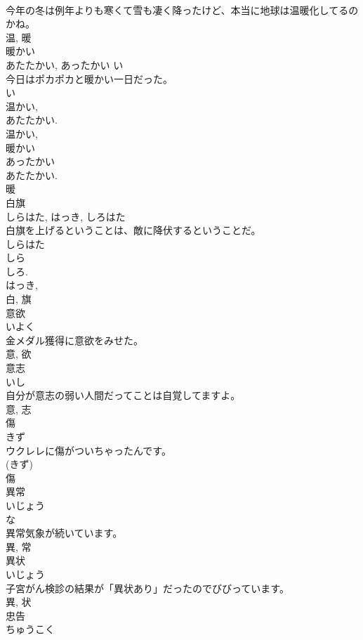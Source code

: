 \documentclass[8pt]{extreport}
\begin{document}
\begin{CJK}{UTF8}{min}
\\	今年の冬は例年よりも寒くて雪も凄く降ったけど、本当に地球は温暖化してるのかね。	
\\	温, 暖	
\\	暖かい	
\\	あたたかい, あったかい	い 
\\	今日はポカポカと暖かい一日だった。	
\\	い 
\\	温かい, 
\\	あたたかい. 
\\	温かい, 
\\	暖かい 
\\	あったかい 
\\	あたたかい. 
\\	暖	
\\	白旗	
\\	しらはた, はっき, しろはた	
\\	白旗を上げるということは、敵に降伏するということだ。	
\\	しらはた 
\\	しら 
\\	しろ. 
\\	はっき, 
\\	白, 旗	
\\	意欲	
\\	いよく	
\\	金メダル獲得に意欲をみせた。	
\\	意, 欲	
\\	意志	
\\	いし	
\\	自分が意志の弱い人間だってことは自覚してますよ。	
\\	意, 志	
\\	傷	
\\	きず	
\\	ウクレレに傷がついちゃったんです。	
\\	(きず) 
\\	傷	
\\	異常	
\\	いじょう	
\\	な 
\\	異常気象が続いています。	
\\	異, 常	
\\	異状	
\\	いじょう	
\\	子宮がん検診の結果が「異状あり」だったのでびびっています。	
\\	異, 状	
\\	忠告	
\\	ちゅうこく	

\end{CJK}
\end{document}
